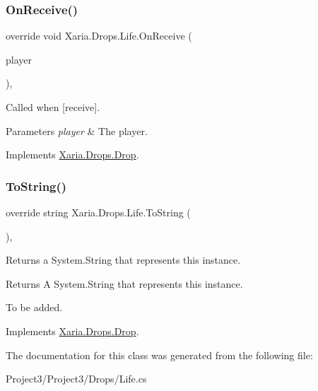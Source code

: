 \subsubsection{\texorpdfstring{On\+Receive()}{OnReceive()}}
{\footnotesize\ttfamily override void Xaria.\+Drops.\+Life.\+On\+Receive (\begin{DoxyParamCaption}\item[{ref \hyperlink{classXaria_1_1Player}{Player}}]{player }\end{DoxyParamCaption})\hspace{0.3cm}{\ttfamily [inline]}, {\ttfamily [virtual]}}



Called when \mbox{[}receive\mbox{]}. 


\begin{DoxyParams}{Parameters}
{\em player} & The player.\\
\hline
\end{DoxyParams}


Implements \hyperlink{classXaria_1_1Drops_1_1Drop_abb5544bb56ff889f557888bd9e86f7cb}{Xaria.\+Drops.\+Drop}.

\mbox{\label{classXaria_1_1Drops_1_1Life_aa75a0f73d72f18d4d9456c3f2a2ea0ce}} 
\subsubsection{\texorpdfstring{To\+String()}{ToString()}}
{\footnotesize\ttfamily override string Xaria.\+Drops.\+Life.\+To\+String (\begin{DoxyParamCaption}{ }\end{DoxyParamCaption})\hspace{0.3cm}{\ttfamily [inline]}, {\ttfamily [virtual]}}



Returns a System.\+String that represents this instance. 

\begin{DoxyReturn}{Returns}
A System.\+String that represents this instance. 
\end{DoxyReturn}


To be added. 

Implements \hyperlink{classXaria_1_1Drops_1_1Drop_abe25441e5c3fe5b2199352f24bfafa4b}{Xaria.\+Drops.\+Drop}.



The documentation for this class was generated from the following file\+:\begin{DoxyCompactItemize}
\item 
Project3/\+Project3/\+Drops/Life.\+cs\end{DoxyCompactItemize}
